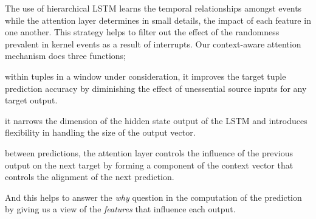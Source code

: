 The use of hierarchical LSTM learns the temporal relationships amongst events 
while the attention layer determines in small details, the impact of each 
feature in one another. This strategy helps to filter out the effect of the 
randomness prevalent in kernel events as a result of interrupts. Our 
context-aware attention mechanism does three functions; 
\begin{enumerate*}[label={\alph*)},font={\bfseries}]
	\item within tuples in a window under consideration, it improves the target 
	tuple prediction accuracy by diminishing the effect of unessential source 
	inputs for any target output.
	\item it narrows the dimension of the hidden state output of the LSTM and 
	introduces flexibility in handling the size of the output vector.
	\item between predictions, the attention layer controls the influence of 
	the previous output on the next target by forming a component of the 
	context vector that controls the alignment of the next prediction.
\end{enumerate*}
And this helps to answer the \emph{why} question in the 
computation of the prediction by giving us a view of the \emph{features} that 
influence each output.\par
